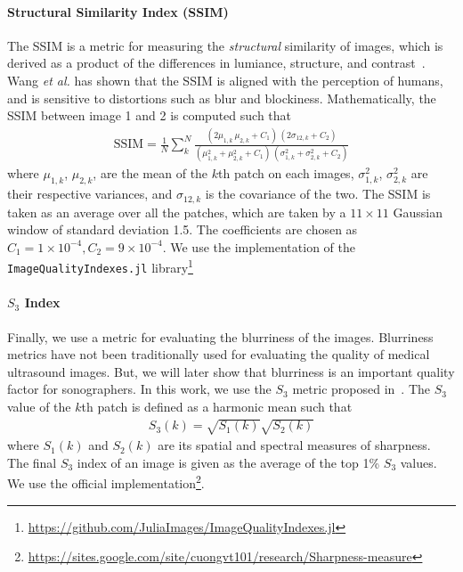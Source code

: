 \paragraph{Structural Similarity Index (SSIM)}
The SSIM is a metric for measuring the \textit{structural} similarity of images, which is derived as a product of the differences in lumiance, structure, and contrast~\cite{wang_image_2004a}.
Wang \textit{et al.} has shown that the SSIM is aligned with the perception of humans, and is sensitive to distortions such as blur and blockiness.
Mathematically, the SSIM between image 1 and 2 is computed such that
\begin{align}
  \mathrm{SSIM} = \frac{1}{N} \sum_k^N \frac{
    (2 \mu_{1,k} \, \mu_{2, k} + C_1)\,(2 \sigma_{12, k} + C_2)
  }{
    (\mu_{1,k}^2 + \mu_{2,k}^2 + C_1)\,( \sigma_{1,k}^2 + \sigma_{2,k}^2 + C_2)
  }
\end{align}
where \(\mu_{1,k}\), \(\mu_{2,k}\), are the mean of the \(k\)th patch on each images, \(\sigma_{1,k}^2\), \(\sigma_{2,k}^2\) are their respective variances, and \(\sigma_{12, k}\) is the covariance of the two.
The SSIM is taken as an average over all the patches, which are taken by a \(11 \times 11\) Gaussian window of standard deviation 1.5.
The coefficients are chosen as \(C_1 = 1 \times 10^{-4}, C_2 = 9 \times 10^{-4} \).
We use the implementation of the \texttt{ImageQualityIndexes.jl} library\footnote{\url{https://github.com/JuliaImages/ImageQualityIndexes.jl}}

\paragraph{\(S_3\) Index}
Finally, we use a metric for evaluating the blurriness of the images.
Blurriness metrics have not been traditionally used for evaluating the quality of medical ultrasound images.
But, we will later show that blurriness is an important quality factor for sonographers.
In this work, we use the \(S_3\) metric proposed in~\cite{vu_bf_2012}.
The \(S_3\) value of the \(k\)th patch is defined as a harmonic mean such that
\begin{align}
  S_3\left(k\right) = \sqrt{S_1\left(k\right)} \sqrt{S_2\left(k\right)}
\end{align}
where \(S_1\left(k\right)\) and \(S_2\left(k\right)\) are its spatial and spectral measures of sharpness.
The final \(S_3\) index of an image is given as the average of the top 1\% \(S_3\) values.
We use the official implementation\footnote{\url{https://sites.google.com/site/cuongvt101/research/Sharpness-measure}}.


